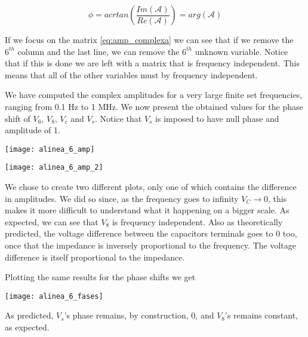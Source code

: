 \begin{center}
    \begin{equation}
        \phi=acrtan\left(\frac{Im(\mathcal{A})}{Re(\mathcal{A})}\right)=arg(\mathcal{A})
    \end{equation}
\end{center}

If we focus on the matrix \ref{eq:amp_complexa} we can see that if we remove the $6^{th}$ column and the last line, we can remove the $6^{th}$ unknown variable. Notice that if this is done we are left with a matrix that is frequency independent. This means that all of the other variables must by frequency independent.

We have computed the complex amplitudes for a very large finite set frequencies, ranging from 0.1 Hz to 1 MHz. We now present the obtained values for the phase shift of $V_6$, $V_8$, $V_c$ and $V_s$. Notice that $V_s$ is imposed to have null phase and amplitude of 1.

\begin{center}
    \texttt{[image: alinea\_6\_amp]}
     \label{fig:amp(f)1}
\end{center}

\begin{center}
    \texttt{[image: alinea\_6\_amp\_2]}
     \label{fig:amp(f)2}
\end{center}

We chose to create two different plots, only one of which contains the difference in amplitudes. We did so since, as the frequency goes to infinity $V_C\longrightarrow0$, this makes it more difficult to understand what it happening on a bigger scale.
As expected, we can see that $V_8$ is frequency independent. Also as theoretically predicted, the voltage difference between the capacitors terminals goes to 0 too, once that the impedance is inversely proportional to the frequency. The voltage difference is itself proportional to the impedance.

Plotting the same results for the phase shifts we get
\begin{center}
    \texttt{[image: alinea\_6\_fases]}
     \label{fig:amp(f)1}
\end{center}

As predicted, $V_s$'s phase remains, by construction, 0, and $V_8$'s remains constant, as expected.
